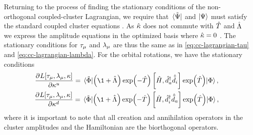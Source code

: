             Returning to the process of finding the stationary conditions of the
            non-orthogonal coupled-cluster Lagrangian, we require that
            $\bra*{\tilde{\Psi}}$ and $\ket{\Psi}$ must satisfy the standard
            coupled cluster equations \cite{rolf-nocc}.
            As $\hat{\kappa}$ does not commute with $\hat{T}$ and $\hat{\Lambda}$ we express
            the amplitude equations in the optimized basis where $\hat{\kappa} = 0$
            \cite{rolf-nocc}.
            The stationary conditions for $\tau_{\mu}$ and
            $\lambda_{\mu}$ are thus the same as in
            \autoref{eq:cc-lagrangian-tau} and
            \autoref{eq:cc-lagrangian-lambda}.
            For the orbital rotations, we have the stationary conditions
            \begin{gather}
                \dpd{L[\clustamp_{\mu}, \clustlamp_{\mu}, \noccten]}{
                    {\noccten^{u}}
                }
                = \mel*{\tilde{\slat}}{
                    \para{\1 + \clustl}
                    \exp(-\clust)
                    \com{\hamil}{\biccr{a}\bican{i}}
                    \exp(\clust)
                }{\slat},
                \\
                \dpd{L[\clustamp_{\mu}, \clustlamp_{\mu}, \noccten]}{
                    {\noccten^{d}}
                }
                = \mel*{\tilde{\slat}}{
                    \para{\1 + \clustl}
                    \exp(-\clust)
                    \com{\hamil}{\biccr{i}\bican{a}}
                    \exp(\clust)
                }{\slat},
            \end{gather}
            where it is important to note that all creation and annihilation
            operators in the cluster amplitudes and the Hamiltonian are the
            biorthogonal operators.

